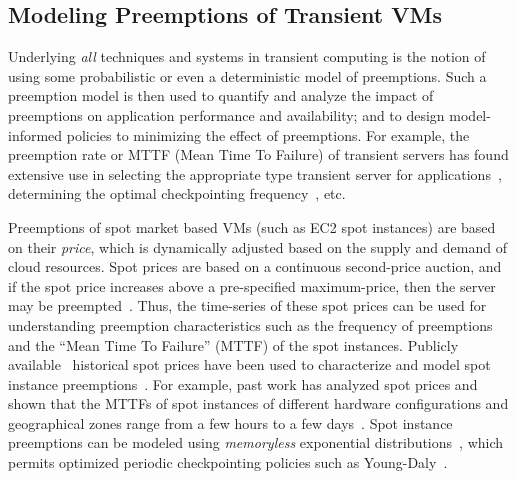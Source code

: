 \documentclass[sigconf]{acmart} %
\newcommand{\subsecspace}[0]{-0.20cm}
\begin{document}
\vspace*{\subsecspace}
\subsection{Modeling Preemptions of Transient VMs}

Underlying \emph{all} techniques and systems in transient computing is the notion of using some probabilistic or even a deterministic model of  preemptions. 
Such a preemption model is then used to quantify and analyze the impact of preemptions on application performance and availability; and to design model-informed policies to minimizing the effect of preemptions. 
For example, the preemption rate or MTTF (Mean Time To Failure) of transient servers has found extensive use in selecting the appropriate type transient server for applications~\cite{exosphere, spoton}, determining the optimal checkpointing frequency~\cite{flint, marathe2014exploiting, proteus-eur17, ghit-spark-hpdc}, etc. 

Preemptions of spot market based VMs (such as EC2 spot instances) are based on their \emph{price}, which is dynamically adjusted based on the supply and demand of cloud resources. 
Spot prices are based on a continuous second-price auction, and if the spot price increases above a pre-specified maximum-price, then the server may be preempted~\cite{spot-pricing2}. 
Thus, the time-series of these spot prices can be used for understanding preemption characteristics such as the frequency of preemptions and the ``Mean Time To Failure'' (MTTF) of the spot instances. 
Publicly available~\cite{bidding4} historical spot prices have been used to characterize and model spot instance preemptions~\cite{spotcheck, bid-cloud, transient-guarantees, wolski2016providing}. 
For example, past work has analyzed spot prices and shown that the MTTFs of spot instances of different hardware configurations and geographical zones range from a few hours to a few days~\cite{wolski_probabilistic_2017, icdcs-spotlight, wolski2016providing, baughman2018predicting, wolski2017probabilistic}.
Spot instance preemptions can be modeled using \emph{memoryless}  exponential distributions~\cite{bid-cloud, hotcloud-not-bid, flint, ghit-spark-hpdc, chien-ic2e19}, which permits optimized periodic checkpointing policies such as Young-Daly~\cite{daly2006higher}. 
\end{document}
